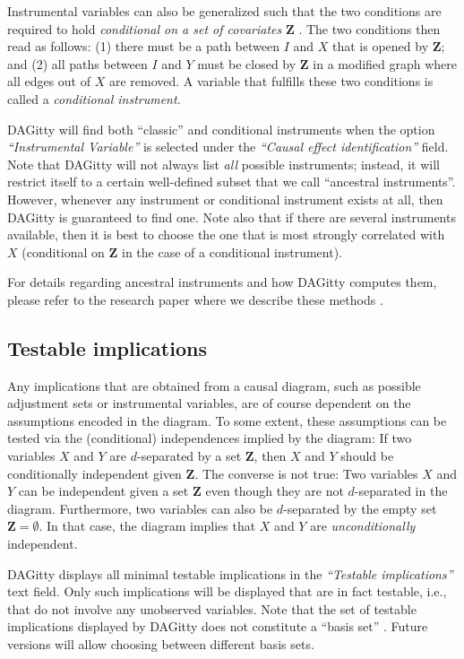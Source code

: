 \documentclass[a4paper,10pt]{article}
\newcommand{\pname}{{\sc DAG}itty\xspace}
\newcommand{\action}[1]{\emph{``#1''}}
\begin{document}
Instrumental variables can also be generalized such that the two conditions are required
to hold \emph{conditional on a set of covariates} $\mathbf{Z}$ \cite{BritoPearlUAI02}. 
The two conditions then read as follows: 
(1) there must be a path between 
$I$ and $X$ that is opened by $\mathbf{Z}$; and (2) 
all paths between $I$ and $Y$ must be closed by $\mathbf{Z}$ 
in a modified graph where all edges out of $X$ are removed. 
A variable that fulfills these two conditions is called a
\emph{conditional instrument}.

\pname will find both ``classic'' and conditional instruments when the option 
\action{Instrumental Variable} is selected under the \action{Causal effect identification} 
field. Note that \pname will not always list \emph{all} possible instruments;
instead, it will restrict itself to a certain well-defined subset that we call 
``ancestral instruments''. However, whenever any instrument or conditional instrument
exists at all, then \pname is guaranteed to find one. Note also that if there are several
instruments available, then it is best to choose the one that is most strongly
correlated with $X$ (conditional on $\mathbf{Z}$ in the case of a conditional instrument).

For details regarding ancestral instruments and how \pname computes them, please
refer to the research paper where we describe these methods \cite{zander15_instrument}.

\subsection{Testable implications}

Any implications that are obtained from a causal diagram,
such as possible adjustment sets or instrumental variables,
are of course dependent on the 
assumptions encoded in the diagram.
To some extent, these assumptions can be tested via the 
(conditional) independences implied by the diagram: If two 
variables $X$ and $Y$ are $d$-separated by a set $\mathbf{Z}$, then
$X$ and $Y$ should be conditionally independent
given $\mathbf{Z}$. The converse is not true: Two variables
$X$ and $Y$ can be independent given a set $\mathbf{Z}$ even though they
are not $d$-separated in the diagram. Furthermore, two 
variables can also be $d$-separated by the empty set $\mathbf{Z}=\emptyset$.
In that case, the diagram implies that $X$ and $Y$ are
\emph{unconditionally} independent.

\pname displays all minimal testable implications 
in the \action{Testable implications} text field. Only such
implications will be displayed that are in fact testable,
i.e., that do not involve any unobserved variables. Note
that the set of testable implications displayed by \pname
does not constitute a ``basis set'' \cite{Pearl2009}. 
Future versions will allow choosing between different basis sets. 
\end{document}
